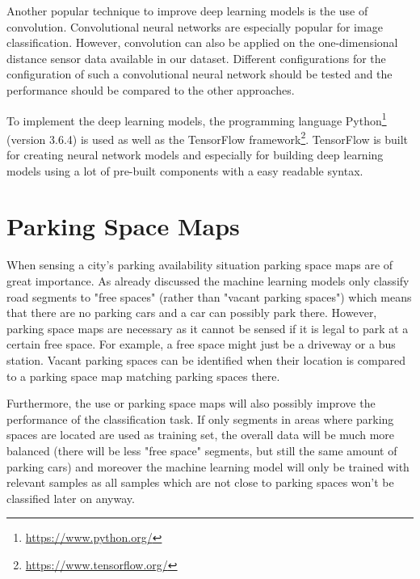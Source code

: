 Another popular technique to improve deep learning models is the use of convolution. Convolutional neural networks are especially popular for image classification. However, convolution can also be applied on the one-dimensional distance sensor data available in our dataset. Different configurations for the configuration of such a convolutional neural network should be tested and the performance should be compared to the other approaches.


To implement the deep learning models, the programming language Python\footnote{\url{https://www.python.org/}} (version 3.6.4) is used as well as the TensorFlow framework\footnote{\url{https://www.tensorflow.org/}}. TensorFlow is built for creating neural network models and especially for building deep learning models using a lot of pre-built components with a easy readable syntax. 




\section{Parking Space Maps}
\label{sec:parking_space_maps}

When sensing a city's parking availability situation parking space maps are of great importance. As already discussed the machine learning models only classify road segments to "free spaces" (rather than "vacant parking spaces") which means that there are no parking cars and a car can possibly park there. However, parking space maps are necessary as it cannot be sensed if it is legal to park at a certain free space. For example, a free space might just be a driveway or a bus station. Vacant parking spaces can be identified when their location is compared to a parking space map matching parking spaces there. 

Furthermore, the use or parking space maps will also possibly improve the performance of the classification task. If only segments in areas where parking spaces are located are used as training set, the overall data will be much more balanced (there will be less "free space" segments, but still the same amount of parking cars) and moreover the machine learning model will only be trained with relevant samples as all samples which are not close to parking spaces won't be classified later on anyway.



